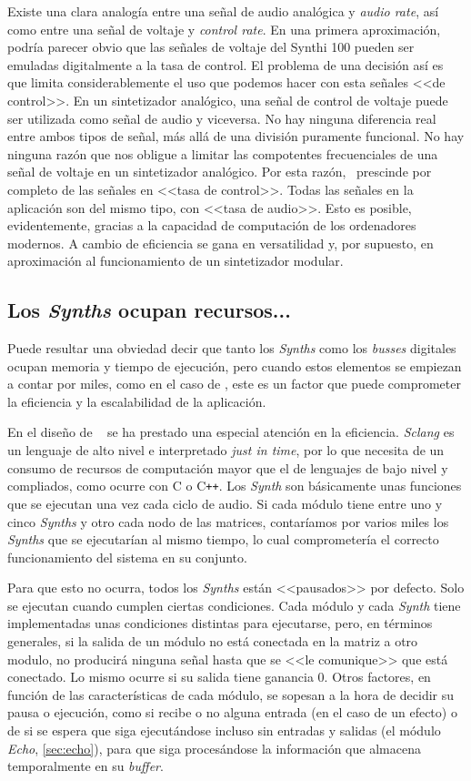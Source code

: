 Existe una clara analogía entre una señal de audio analógica y \textit{audio rate}, así como entre una señal de voltaje y \textit{control rate}. En una primera aproximación, podría parecer obvio que las señales de voltaje del Synthi 100 pueden ser emuladas digitalmente a la tasa de control. El problema de una decisión así es que limita considerablemente el uso que podemos hacer con esta señales <<de control>>. En un sintetizador analógico, una señal de control de voltaje puede ser utilizada como señal de audio y viceversa. No hay ninguna diferencia real entre ambos tipos de señal, más allá de una división puramente funcional. No hay ninguna razón que nos obligue a limitar las compotentes frecuenciales de una señal de voltaje en un sintetizador analógico. Por esta razón, \appName\ prescinde por completo de las señales en <<tasa de control>>. Todas las señales en la aplicación son del mismo tipo, con <<tasa de audio>>. Esto es posible, evidentemente, gracias a la capacidad de computación de los ordenadores modernos. A cambio de eficiencia se gana en versatilidad y, por supuesto, en aproximación al funcionamiento de un sintetizador modular.


\subsection{Los \textit{Synths} ocupan recursos...}
Puede resultar una obviedad decir que tanto los \textit{Synths} como los \textit{busses} digitales ocupan memoria y tiempo de ejecución, pero cuando estos elementos se empiezan a contar por miles, como en el caso de \appName, este es un factor que puede comprometer la eficiencia y la escalabilidad de la aplicación.

En el diseño de \appName~ se ha prestado una especial atención en la eficiencia. \textit{Sclang} es un lenguaje de alto nivel e interpretado \textit{just in time}, por lo que necesita de un consumo de recursos de computación mayor que el de lenguajes de bajo nivel y compliados, como ocurre con C o C\texttt{++}. Los \textit{Synth} son básicamente unas funciones que se ejecutan una vez cada ciclo de audio. Si cada módulo tiene entre uno y cinco \textit{Synths} y otro cada nodo de las matrices, contaríamos por varios miles los \textit{Synths} que se ejecutarían al mismo tiempo, lo cual comprometería el correcto funcionamiento del sistema en su conjunto.

Para que esto no ocurra, todos los \textit{Synths} están <<pausados>> por defecto. Solo se ejecutan cuando cumplen ciertas condiciones. Cada módulo y cada \textit{Synth} tiene implementadas unas condiciones distintas para ejecutarse, pero, en términos generales, si la salida de un módulo no está conectada en la matriz a otro modulo, no producirá ninguna señal hasta que se <<le comunique>> que está conectado. Lo mismo ocurre si su salida tiene ganancia $0$. Otros factores, en función de las características de cada módulo, se sopesan a la hora de decidir su pausa o ejecución, como si recibe o no alguna entrada (en el caso de un efecto) o de si se espera que siga ejecutándose incluso sin entradas y salidas (el módulo \textit{Echo}, \ref{sec:echo}), para que siga procesándose la información que almacena temporalmente en su \textit{buffer}. 


